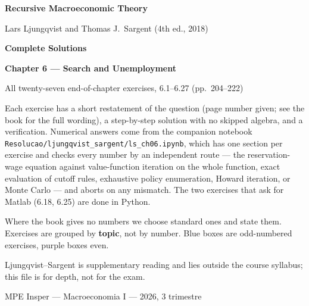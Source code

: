 \documentclass[12pt, letterpaper]{article}
\begin{document}
\begin{titlepage}
\centering
\vspace*{2.5cm}
{\Huge\bfseries\color{darkblue} Recursive Macroeconomic Theory\par}
\vspace{6pt}
{\large Lars Ljungqvist and Thomas J.\ Sargent (4th ed., 2018)\par}
\vspace{1.4cm}
{\LARGE\bfseries Complete Solutions\par}
\vspace{6pt}
{\LARGE\bfseries Chapter 6 --- Search and Unemployment\par}
\vspace{1.2cm}
{\large All twenty-seven end-of-chapter exercises, 6.1--6.27 (pp.~204--222)\par}
\vspace{2cm}

\begin{tcolorbox}[theorybox,title={What is in this file},width=0.86\textwidth]
\small
Each exercise has a short restatement of the question (page number given; see the book for the full
wording), a step-by-step solution with no skipped algebra, and a verification. Numerical answers
come from the companion notebook \texttt{Resolucao/ljungqvist\_sargent/ls\_ch06.ipynb}, which has one
section per exercise and checks every number by an independent route --- the reservation-wage
equation against value-function iteration on the whole function, exact evaluation of cutoff rules,
exhaustive policy enumeration, Howard iteration, or Monte Carlo --- and aborts on any mismatch. The
two exercises that ask for Matlab (6.18, 6.25) are done in Python.

\smallskip
Where the book gives no numbers we choose standard ones and state them. Exercises are grouped by
\textbf{topic}, not by number. Blue boxes are odd-numbered exercises, purple boxes even.

\smallskip
Ljungqvist--Sargent is supplementary reading and lies outside the course syllabus; this file is
for depth, not for the exam.
\end{tcolorbox}

\vfill
{\small MPE Insper --- Macroeconomia I --- 2026, 3\textordmasculine{} trimestre\par}
\end{titlepage}
\end{document}
